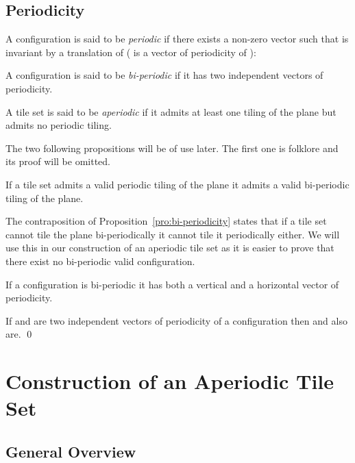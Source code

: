 \documentclass{jac}
\begin{document}
\subsection{Periodicity}

\begin{definition}[Periodicity]\label{def:periodicity}
	A configuration  is said to be \emph{periodic} if there exists a non-zero vector  such that  is invariant by a translation of  ( is a vector of periodicity of ):
	
	A configuration is said to be \emph{bi-periodic} if it has two independent vectors of periodicity.
\end{definition}

\begin{definition}[Aperiodicity]\label{def:aperiodicity}
	A tile set is said to be \emph{aperiodic} if it admits at least one tiling of the plane but admits no periodic tiling.
\end{definition}
The two following propositions will be of use later. The first one is folklore and its proof will be omitted.

\begin{proposition}
	\label{pro:bi-periodicity}
    If a tile set admits a valid periodic tiling of the plane it admits a valid bi-periodic tiling of the plane.
\end{proposition}

\remark The contraposition of Proposition~\ref{pro:bi-periodicity} states that if a tile set cannot tile the plane bi-periodically it cannot tile it periodically either. We will use this in our construction of an aperiodic tile set as it is easier to prove that there exist no bi-periodic valid configuration.

\begin{proposition}\label{pro:vertical}
	If a configuration is bi-periodic it has both a vertical and a horizontal vector of periodicity.
\end{proposition}
\proof
If  and  are two independent vectors of periodicity of a configuration then  and  also are.
\qed


\section{Construction of an Aperiodic Tile Set} \label{sec:the_main_construction}

\subsection{General Overview} \label{sub:general_overview}
\end{document}
